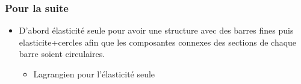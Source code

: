 \documentclass{beamer}
\begin{document}
	\begin{frame}
		\frametitle{Pour la suite}
		
		\begin{itemize}
			\item D'abord élasticité seule pour avoir une structure avec des barres fines puis elasticite+cercles afin que les composantes connexes des sections de chaque barre soient circulaires.
			
			
			\begin{itemize}
				\item Lagrangien pour l'élasticité seule
			\end{itemize}
			
			\vspace{1cm}
			

\end{itemize}
\end{frame}
\end{document}
